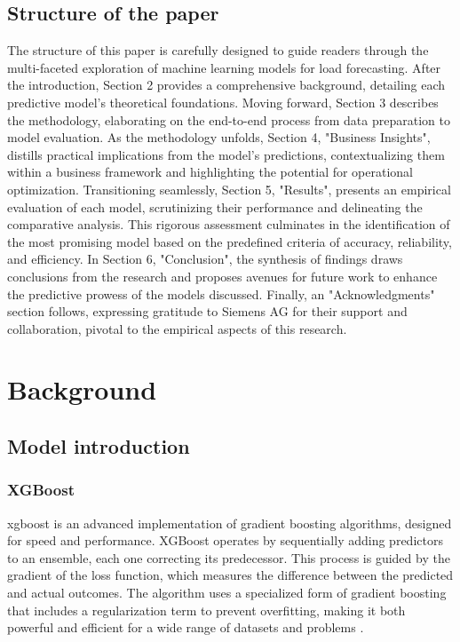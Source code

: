 \documentclass{article} %
\begin{document}
\subsection{Structure of the paper}
The structure of this paper is carefully designed to guide readers through the multi-faceted exploration of machine learning models for load forecasting. After the introduction, Section 2 provides a comprehensive background, detailing each predictive model's theoretical foundations. Moving forward, Section 3 describes the methodology, elaborating on the end-to-end process from data preparation to model evaluation. As the methodology unfolds, Section 4, "Business Insights", distills practical implications from the model's predictions, contextualizing them within a business framework and highlighting the potential for operational optimization. Transitioning seamlessly, Section 5, "Results", presents an empirical evaluation of each model, scrutinizing their performance and delineating the comparative analysis. This rigorous assessment culminates in the identification of the most promising model based on the predefined criteria of accuracy, reliability, and efficiency.
In Section 6, "Conclusion", the synthesis of findings draws conclusions from the research and proposes avenues for future work to enhance the predictive prowess of the models discussed. Finally, an "Acknowledgments" section follows, expressing gratitude to Siemens AG for their support and collaboration, pivotal to the empirical aspects of this research.

\section{Background}
\subsection{Model introduction}
\subsubsection{XGBoost}     
\gls{xgboost} is an advanced implementation of gradient boosting algorithms, designed for speed and performance. 
XGBoost operates by sequentially adding predictors to an ensemble, each one correcting its predecessor. This process is guided by the gradient of the loss function, which measures the difference between the predicted and actual outcomes. The algorithm uses a specialized form of gradient boosting that includes a regularization term to prevent overfitting, making it both powerful and efficient for a wide range of datasets and problems  \cite{chen2015xgboost}.
\end{document}
